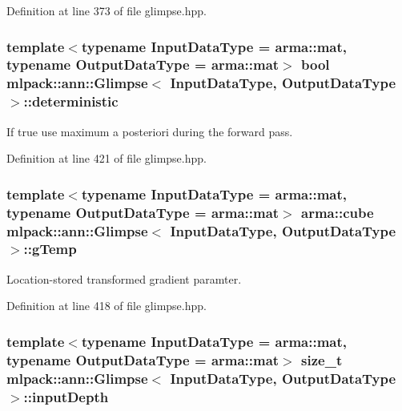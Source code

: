 Definition at line 373 of file glimpse.\+hpp.

\subsubsection[{deterministic}]{\setlength{\rightskip}{0pt plus 5cm}template$<$typename Input\+Data\+Type  = arma\+::mat, typename Output\+Data\+Type  = arma\+::mat$>$ bool {\bf mlpack\+::ann\+::\+Glimpse}$<$ Input\+Data\+Type, Output\+Data\+Type $>$\+::deterministic\hspace{0.3cm}{\ttfamily [private]}}\label{classmlpack_1_1ann_1_1Glimpse_a4f4f4313b37a078ffa1207c9388cc7a0}


If true use maximum a posteriori during the forward pass. 



Definition at line 421 of file glimpse.\+hpp.

\subsubsection[{g\+Temp}]{\setlength{\rightskip}{0pt plus 5cm}template$<$typename Input\+Data\+Type  = arma\+::mat, typename Output\+Data\+Type  = arma\+::mat$>$ arma\+::cube {\bf mlpack\+::ann\+::\+Glimpse}$<$ Input\+Data\+Type, Output\+Data\+Type $>$\+::g\+Temp\hspace{0.3cm}{\ttfamily [private]}}\label{classmlpack_1_1ann_1_1Glimpse_ad046e3afe15d43bab2401d81e04d082c}


Location-\/stored transformed gradient paramter. 



Definition at line 418 of file glimpse.\+hpp.

\subsubsection[{input\+Depth}]{\setlength{\rightskip}{0pt plus 5cm}template$<$typename Input\+Data\+Type  = arma\+::mat, typename Output\+Data\+Type  = arma\+::mat$>$ size\+\_\+t {\bf mlpack\+::ann\+::\+Glimpse}$<$ Input\+Data\+Type, Output\+Data\+Type $>$\+::input\+Depth\hspace{0.3cm}{\ttfamily [private]}}\label{classmlpack_1_1ann_1_1Glimpse_a9bcb5f708f178a992d8ed1148c8d1c88}



